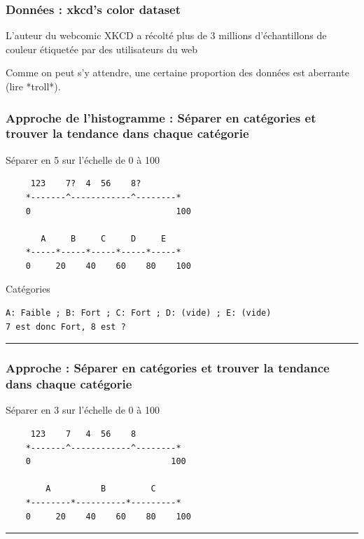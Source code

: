 \documentclass[french]{beamer}
\begin{document}
\begin{frame}
\frametitle{Données : xkcd's color dataset}
L'auteur du webcomic XKCD a récolté plus de 3 millions d'échantillons de couleur étiquetée par des utilisateurs du web

Comme on peut s'y attendre, une certaine proportion des données est aberrante (lire *troll*).

\end{frame}


\begin{frame}[fragile]
\frametitle{Approche de l'histogramme : Séparer en catégories et trouver la tendance dans chaque catégorie}

{Séparer en 5 sur l'échelle de 0 à
100}

\begin{verbatim}
     123    7?  4  56    8?
    *-------^------------^--------*
    0                             100

       A     B     C     D     E
    *-----*-----*-----*-----*-----*
    0     20    40    60    80    100
\end{verbatim}

{Catégories}

\begin{verbatim}
A: Faible ; B: Fort ; C: Fort ; D: (vide) ; E: (vide)
7 est donc Fort, 8 est ?
\end{verbatim}
\begin{center}\rule{3in}{0.4pt}\end{center}
\end{frame}

\begin{frame}[fragile]
\frametitle{Approche : Séparer en catégories et trouver la tendance dans
chaque
catégorie}

{Séparer en 3 sur l'échelle de 0 à
100}

\begin{verbatim}
     123    7   4  56    8 
    *-------^------------^--------*
    0                            100
    
        A          B         C
    *--------*----------*---------*
    0     20    40    60    80    100
\end{verbatim}
\begin{center}\rule{3in}{0.4pt}\end{center}
\end{frame}
\end{document}
